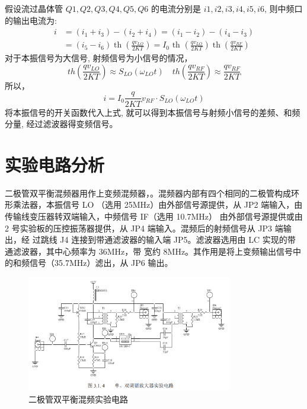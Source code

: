 \documentclass{../source/Experiment}
\begin{document}
假设流过晶体管 $Q1,Q2,Q3,Q4,Q5,Q6$ 的电流分别是 $i1,i2,i3,i4,i5,i6$, 则中频口的输出电流为:
$$
    \begin{aligned}
        i & =\left(i_{1}+i_{3}\right)-\left(i_{2}+i_{4}\right)=\left(i_{1}-i_{2}\right)-\left(i_{4}-i_{3}\right)                                                                                         \\
          & =\left(i_{5}-i_{6}\right) \operatorname{th}\left(\frac{q v_{L O}}{2 K T}\right)=I_{0} \text { th }\left(\frac{q v_{L O}}{2 K T}\right) \operatorname{th}\left(\frac{q v_{R F}}{2 K T}\right)
    \end{aligned}
$$
对于本振信号为大信号, 射频信号为小信号的情况，
$$
    t h\left(\frac{q v_{L O}}{2 K T}\right) \approx S_{L O}\left(\omega_{L O} t\right) \quad t h\left(\frac{q v_{R F}}{2 K T}\right) \approx \frac{q v_{R F}}{2 K T}
$$
所以，
$$
    i=I_{0} \frac{q}{2 K T} v_{R F} \cdot S_{L O}\left(\omega_{L O} t\right)
$$
将本振信号的开关函数代入上式, 就可以得到本振信号与射频小信号的差频、和频分量, 经过滤波器得变频信号。
\section{实验电路分析}



二极管双平衡混频器用作上变频混频器，。混频器内部有四个相同的二极管构成环形乘法器，本振信号 LO
（选用 25MHz）由外部信号源提供，从 JP2 端输入，由传输线变压器转双端输入，中频信号 IF（选用 10.7MHz）
由外部信号源提供或由 2 号实验板的压控振荡器提供，从 JP4 端输入。混频后的射频信号从 JP3 端输出，经
过跳线 J4 连接到带通滤波器的输入端 JP5。滤波器选用由 LC 实现的带通滤波器，其中心频率为 36MHz，带
宽约 8MHz。其作用是将上变频输出信号中的和频信号（35.7MHz）滤出，从 JP6 输出。
\begin{figure}[H]
    \centering
    \includegraphics[width = 0.8\textwidth]{pic/fig2.png}
    \caption{二极管双平衡混频实验电路}
\end{figure}
\end{document}
